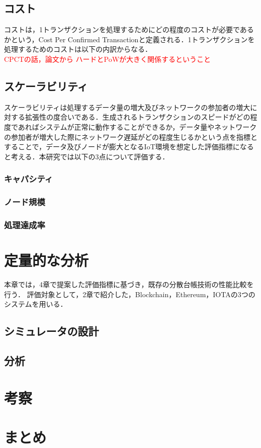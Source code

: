 \documentclass[japanese, macos]{KU2}
\begin{document}
\section{コスト}
コストは，1トランザクションを処理するためにどの程度のコストが必要であるかという，Cost Per Confirmed Transactionと定義される．1トランザクションを処理するためのコストは以下の内訳からなる．\\
\textcolor{red}{CPCTの話，論文から ハードとPoWが大きく関係するということ}

\section{スケーラビリティ}
スケーラビリティは処理するデータ量の増大及びネットワークの参加者の増大に対する拡張性の度合いである．生成されるトランザクションのスピードがどの程度であればシステムが正常に動作することができるか，データ量やネットワークの参加者が増大した際にネットワーク遅延がどの程度生じるかという点を指標とすることで，データ及びノードが膨大となるIoT環境を想定した評価指標になると考える．本研究では以下の3点について評価する．
\subsection{キャパシティ}
\subsection{ノード規模}
\subsection{処理達成率}

\chapter{定量的な分析}
本章では，4章で提案した評価指標に基づき，既存の分散台帳技術の性能比較を行う．
評価対象として，2章で紹介した，Blockchain，Ethereum，IOTAの3つのシステムを用いる．
\section{シミュレータの設計}

\section{分析}


\chapter{考察}


\chapter{まとめ}


\end{document}

